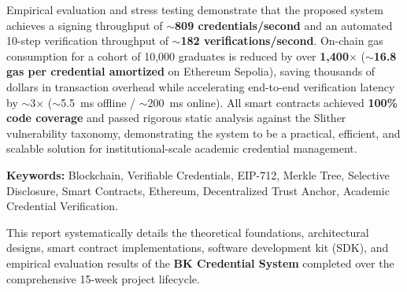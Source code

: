 \documentclass[a4paper,12pt]{report}
\begin{document}
Empirical evaluation and stress testing demonstrate that the proposed system achieves a signing throughput of $\sim$\textbf{809 credentials/second} and an automated 10-step verification throughput of $\sim$\textbf{182 verifications/second}. On-chain gas consumption for a cohort of 10,000 graduates is reduced by over \textbf{1,400$\times$} ($\sim$\textbf{16.8 gas per credential amortized} on Ethereum Sepolia), saving thousands of dollars in transaction overhead while accelerating end-to-end verification latency by $\sim$3$\times$ ($\sim$5.5~ms offline / $\sim$200~ms online). All smart contracts achieved \textbf{100\% code coverage} and passed rigorous static analysis against the Slither vulnerability taxonomy, demonstrating the system to be a practical, efficient, and scalable solution for institutional-scale academic credential management.

\vspace{0.5cm}
\noindent\textbf{Keywords:} Blockchain, Verifiable Credentials, EIP-712, Merkle Tree, Selective Disclosure, Smart Contracts, Ethereum, Decentralized Trust Anchor, Academic Credential Verification.

\iffalse %

This report systematically details the theoretical foundations, architectural designs, smart contract implementations, software development kit (SDK), and empirical evaluation results of the \textbf{BK Credential System} completed over the comprehensive 15-week project lifecycle.
\end{document}
